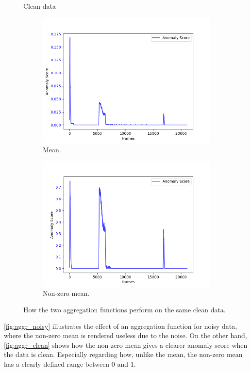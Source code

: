 \begin{figure}[H]
    \centering
    Clean data
    \begin{subfigure}[t]{0.5\textwidth}
        \centering
        \includegraphics[width=\textwidth]{resources/methodology/aggr_clean_mean.png}
        \caption{Mean.}

    \end{subfigure}%
    \begin{subfigure}[t]{0.5\textwidth}
        \centering
        \includegraphics[width=\textwidth]{resources/methodology/aggr_clean_nzmean.png}
        \caption{Non-zero mean.}
    \end{subfigure}
    \caption[Aggregation Functions on Clean Data]{How the two aggregation functions perform on the same clean data.}
    \label{fig:aggr_clean}
\end{figure}
\autoref{fig:aggr_noisy} illustrates the effect of an aggregation function for noisy data, where the non-zero mean is rendered useless due to the noise. On the other hand, \autoref{fig:aggr_clean} shows how the non-zero mean gives a clearer anomaly score when the data is clean. Especially regarding how, unlike the mean, the non-zero mean has a clearly defined range between 0 and 1.
